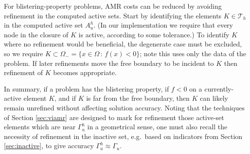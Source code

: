 \documentclass[]{interact}
\theoremstyle{plain}%
\theoremstyle{definition}
\theoremstyle{remark}
\newcommand{\cT}{\mathcal{T}}
\begin{document}
For blistering-property problems, AMR costs can be reduced by avoiding refinement in the computed active sets.  Start by identifying the elements $K\in \cT_h$ in the computed active set $A_u^h$.  (In our implementation we require that every node in the closure of $K$ is active, according to some tolerance.)  To identify $K$ where no refinement would be beneficial, the degenerate case must be excluded, so we require $K \subset \Omega_- = \{x\in \Omega\,:\,f(x) < 0\}$; note this uses only the data of the problem.  If later refinements move the free boundary to be incident to $K$ then refinement of $K$ becomes appropriate.

In summary, if a problem has the blistering property, if $f < 0$ on a currently-active element $K$, and if $K$ is far from the free boundary, then $K$ can likely remain unrefined without affecting solution accuracy.  Noting that the techniques of Section \ref{sec:viamr} are designed to mark for refinement those active-set elements which are near $\Gamma_u^h$ in a geometrical sense, one must also recall the necessity of refinement in the inactive set, e.g.~based on indicators from Section \ref{sec:inactive}, to give accuracy $\Gamma_u^h \approx \Gamma_u$.
\end{document}
